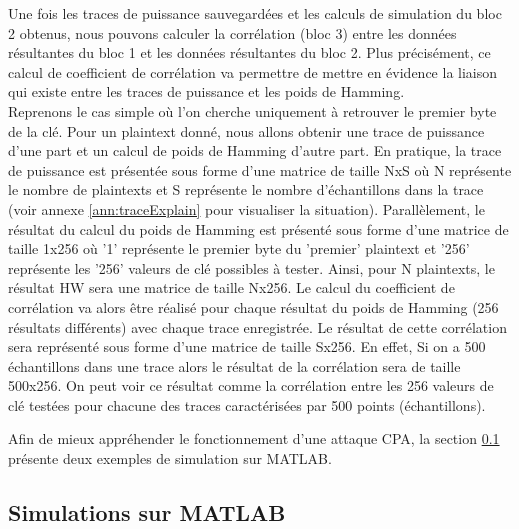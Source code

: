 \documentclass[10pt, oneside, a4paper]{article}
\begin{document}
Une fois les traces de puissance sauvegardées et les calculs de simulation du bloc 2 obtenus, nous pouvons calculer la corrélation (bloc 3) entre les données résultantes du bloc 1 et les données résultantes du bloc 2. Plus précisément, ce calcul de coefficient de corrélation va permettre de mettre en évidence la liaison qui existe entre les traces de puissance et les poids de Hamming. \\ 
Reprenons le cas simple où l'on cherche uniquement à retrouver le premier byte de la clé. Pour un plaintext donné, nous allons obtenir une trace de puissance d'une part et un calcul de poids de Hamming d'autre part. En pratique, la trace de puissance est présentée sous forme d'une matrice de taille NxS où N représente le nombre de plaintexts et S représente le nombre d'échantillons dans la trace (voir annexe \ref{ann:traceExplain} pour visualiser la situation). Parallèlement, le résultat du calcul du poids de Hamming est présenté sous forme d'une matrice de taille 1x256 où '1' représente le premier byte du 'premier' plaintext et '256' représente les '256' valeurs de clé possibles à tester. Ainsi, pour N plaintexts, le résultat HW sera une matrice de taille Nx256. Le calcul du coefficient de corrélation va alors être réalisé pour chaque résultat du poids de Hamming (256 résultats différents) avec chaque trace enregistrée. Le résultat de cette corrélation sera représenté sous forme d'une matrice de taille Sx256. En effet, Si on a 500 échantillons dans une trace alors le résultat de la corrélation sera de taille 500x256. On peut voir ce résultat comme la corrélation entre les 256 valeurs de clé testées pour chacune des traces caractérisées par 500 points (échantillons).

Afin de mieux appréhender le fonctionnement d'une attaque CPA, la section \ref{sec:simulCPA} présente deux exemples de simulation sur MATLAB.








\newpage

\subsection{Simulations sur MATLAB}
\label{sec:simulCPA}
\end{document}
